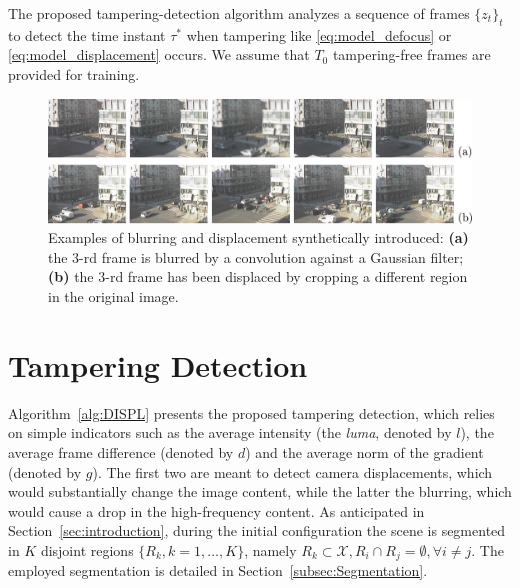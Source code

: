 \documentclass{llncs}
\begin{document}
The proposed tampering-detection algorithm analyzes a sequence of frames $\{z_t\}_t$ to detect the time instant $\tau^*$ when tampering like \eqref{eq:model_defocus} or \eqref{eq:model_displacement} occurs. We assume that $T_0$ tampering-free frames are provided for training.

\begin{figure}[t]
\centering
\includegraphics[width=1\linewidth]{Immagini/sequenze}
\caption{Examples of blurring and displacement synthetically introduced: \textbf{(a)} the 3-rd frame is blurred by a convolution against a Gaussian filter; \textbf{(b)} the 3-rd frame has been displaced by cropping a different region in the original image.}
\label{fig:sequences}
\end{figure}

\section{Tampering Detection}\label{sec:propSol}

Algorithm~\ref{alg:DISPL} presents the proposed tampering detection, which relies on simple indicators such as the average intensity (the \emph{luma}, denoted by $l$), the average frame difference (denoted by $d$) and the average norm of the gradient (denoted by $g$). The first two are meant to detect camera displacements, which would substantially change the image content, while the latter the blurring, which would cause a drop in the high-frequency content. As anticipated in Section~\ref{sec:introduction}, during the initial configuration the scene is segmented in $K$ disjoint regions $\{R_k, k = 1,\dots,K\}$, namely $R_k \subset \mathcal{X}, R_i \cap R_j = \emptyset, \forall i \neq j$. The employed segmentation is detailed in Section~\ref{subsec:Segmentation}. 
\end{document}
